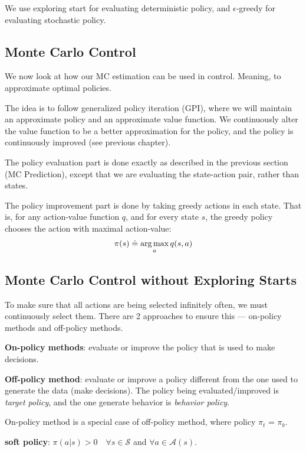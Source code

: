 \documentclass[sutton_barto_notes.tex]{subfiles}
\begin{document}
We use exploring start for evaluating deterministic policy, and $\epsilon$-greedy for evaluating stochastic policy.

\subsection{Monte Carlo Control}

We now look at how our MC estimation can be used in control. Meaning, to approximate optimal policies.

The idea is to follow generalized policy iteration (GPI), where we will maintain an approximate policy and an approximate value function.
We continuously alter the value function to be a better approximation for the policy, and the policy is continuously improved (see previous chapter).


The policy evaluation part is done exactly as described in the previous section (MC Prediction), except that we are evaluating the state-action pair, rather than states.

The policy improvement part is done by taking greedy actions in each state. That is, for any action-value function $q$, and for every state $s$, the greedy policy chooses the action with maximal action-value:
$$ \pi(s) \doteq \operatorname*{arg\,max}_a q(s,a) $$

\subsection{Monte Carlo Control without Exploring Starts}

To make sure that all actions are being selected infinitely often, we must continuously select them.
There are 2 approaches to ensure this — on-policy methods and off-policy methods.

\begin{definition}
\textbf{On-policy methods}: evaluate or improve the policy that is used to make decisions.
\end{definition}
\begin{definition}
\textbf{Off-policy method}: evaluate or improve a policy different from the one used to generate the data (make decisions). The policy being evaluated/improved is \textit{target policy}, and the one generate behavior is \textit{behavior policy}.
\end{definition}

On-policy method is a special case of off-policy method, where policy $\pi_t$ = $\pi_b$.

\begin{definition}
\textbf{soft policy}: $\pi(a|s) > 0\quad \forall s \in \mathcal{S}$ and $\forall a \in \mathcal{A}(s).$
\end{definition}
\end{document}
